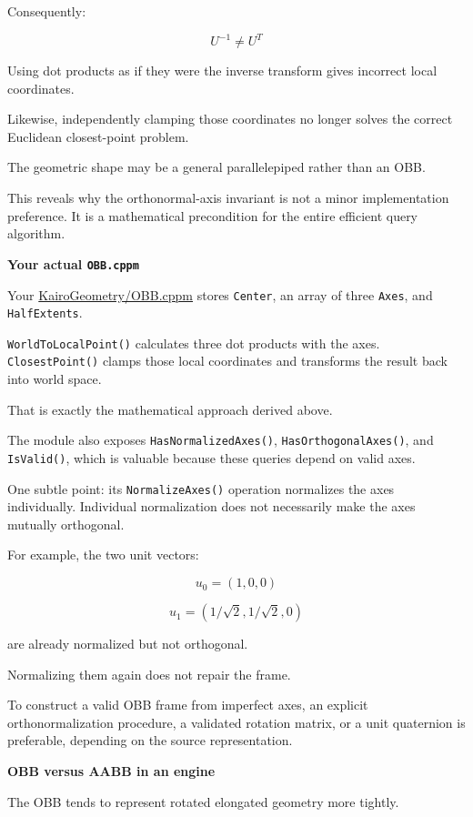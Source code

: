 Consequently:

\[
U^{-1}\ne U^T
\]

Using dot products as if they were the inverse transform gives incorrect local coordinates.

Likewise, independently clamping those coordinates no longer solves the correct Euclidean closest-point problem.

The geometric shape may be a general parallelepiped rather than an OBB.

This reveals why the orthonormal-axis invariant is not a minor implementation preference. It is a mathematical precondition for the entire efficient query algorithm.

\textbf{Your actual \texttt{OBB.cppm}}

Your \href{https://github.com/swayam8624/KairoGeometry/blob/master/OBB.cppm?utm_source=chatgpt.com}{KairoGeometry/OBB.cppm} stores \texttt{Center}, an array of three \texttt{Axes}, and \texttt{HalfExtents}.

\texttt{WorldToLocalPoint()} calculates three dot products with the axes. \texttt{ClosestPoint()} clamps those local coordinates and transforms the result back into world space.

That is exactly the mathematical approach derived above.

The module also exposes \texttt{HasNormalizedAxes()}, \texttt{HasOrthogonalAxes()}, and \texttt{IsValid()}, which is valuable because these queries depend on valid axes.

One subtle point: its \texttt{NormalizeAxes()} operation normalizes the axes individually. Individual normalization does not necessarily make the axes mutually orthogonal.

For example, the two unit vectors:

\[
u_0=(1,0,0)
\]

\[
u_1=(1/\sqrt2,1/\sqrt2,0)
\]

are already normalized but not orthogonal.

Normalizing them again does not repair the frame.

To construct a valid OBB frame from imperfect axes, an explicit orthonormalization procedure, a validated rotation matrix, or a unit quaternion is preferable, depending on the source representation.

\textbf{OBB versus AABB in an engine}

The OBB tends to represent rotated elongated geometry more tightly.

